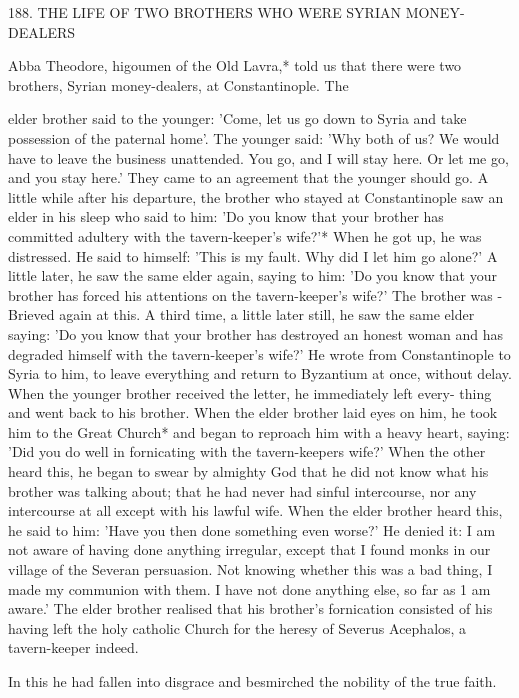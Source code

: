 188. THE LIFE OF TWO BROTHERS
WHO WERE SYRIAN MONEY-DEALERS

Abba Theodore, higoumen of the Old Lavra,* told us that there
were two brothers, Syrian money-dealers, at Constantinople. The

elder brother said to the younger: 'Come, let us go down to Syria
and take possession of the paternal home'. The younger said: 'Why
both of us? We would have to leave the business unattended. You
go, and I will stay here. Or let me go, and you stay here.' They
came to an agreement that the younger should go. A little while
after his departure, the brother who stayed at Constantinople saw
an elder in his sleep who said to him: 'Do you know that your
brother has committed adultery with the tavern-keeper's wife?'*
When he got up, he was distressed. He said to himself: 'This is my
fault. Why did I let him go alone?' A little later, he saw the same
elder again, saying to him: 'Do you know that your brother has
forced his attentions on the tavern-keeper's wife?' The brother was
-Brieved again at this. A third time, a little later still, he saw the same
elder saying: 'Do you know that your brother has destroyed an
honest woman and has degraded himself with the tavern-keeper's
wife?' He wrote from Constantinople to Syria to him, to leave
everything and return to Byzantium at once, without delay. When
the younger brother received the letter, he immediately left every-
thing and went back to his brother. When the elder brother laid
eyes on him, he took him to the Great Church* and began to
reproach him with a heavy heart, saying: 'Did you do well in
fornicating with the tavern-keeper\textquotesingle s wife?' When the other heard
this, he began to swear by almighty God that he did not know what
his brother was talking about; that he had never had sinful
intercourse, nor any intercourse at all except with his lawful wife.
When the elder brother heard this, he said to him: 'Have you then
done something even worse?' He denied it: I am not aware of
having done anything irregular, except that I found monks in our
village of the Severan persuasion. Not knowing whether this was a
bad thing, I made my communion with them. I have not done
anything else, so far as 1 am aware.' The elder brother realised that
his brother's fornication consisted of his having left the holy catholic
Church for the heresy of Severus Acephalos, a tavern-keeper indeed.

In this he had fallen into disgrace and besmirched the nobility of the
true faith.


